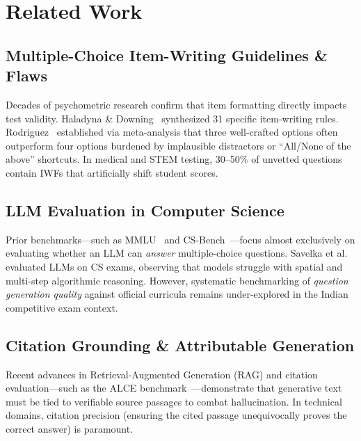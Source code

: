 \documentclass[10pt,twocolumn,letterpaper]{article}
\begin{document}
\section{Related Work}

\subsection{Multiple-Choice Item-Writing Guidelines \& Flaws}
Decades of psychometric research confirm that item formatting directly impacts test validity. Haladyna \& Downing~\cite{haladyna1989taxonomy} synthesized 31 specific item-writing rules. Rodriguez~\cite{rodriguez2005three} established via meta-analysis that three well-crafted options often outperform four options burdened by implausible distractors or ``All/None of the above'' shortcuts. In medical and STEM testing, 30--50\% of unvetted questions contain IWFs that artificially shift student scores.

\subsection{LLM Evaluation in Computer Science}
Prior benchmarks---such as MMLU~\cite{hendrycks2021measuring} and CS-Bench~\cite{zeng2024csbench}---focus almost exclusively on evaluating whether an LLM can \textit{answer} multiple-choice questions. Savelka et al.~\cite{savelka2023large} evaluated LLMs on CS exams, observing that models struggle with spatial and multi-step algorithmic reasoning. However, systematic benchmarking of \textit{question generation quality} against official curricula remains under-explored in the Indian competitive exam context.

\subsection{Citation Grounding \& Attributable Generation}
Recent advances in Retrieval-Augmented Generation (RAG) and citation evaluation---such as the ALCE benchmark~\cite{gao2023enabling}---demonstrate that generative text must be tied to verifiable source passages to combat hallucination. In technical domains, citation precision (ensuring the cited passage unequivocally proves the correct answer) is paramount.
\end{document}
